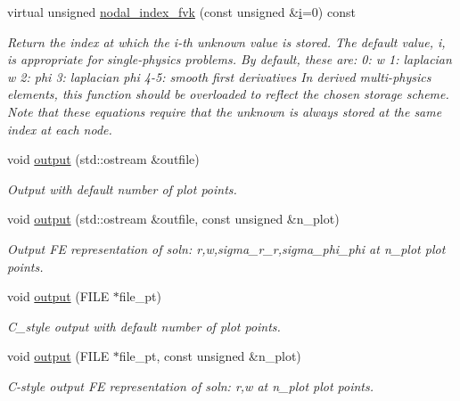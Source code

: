 \begin{DoxyCompactItemize}
virtual unsigned \hyperlink{classoomph_1_1AxisymFoepplvonKarmanEquations_a481e2bbbd87723e7b91a79bcb83e361c}{nodal\+\_\+index\+\_\+fvk} (const unsigned \&\hyperlink{cfortran_8h_adb50e893b86b3e55e751a42eab3cba82}{i}=0) const
\begin{DoxyCompactList}\small\item\em Return the index at which the i-\/th unknown value is stored. The default value, i, is appropriate for single-\/physics problems. By default, these are\+: 0\+: w 1\+: laplacian w 2\+: phi 3\+: laplacian phi 4-\/5\+: smooth first derivatives In derived multi-\/physics elements, this function should be overloaded to reflect the chosen storage scheme. Note that these equations require that the unknown is always stored at the same index at each node. \end{DoxyCompactList}\item 
void \hyperlink{classoomph_1_1AxisymFoepplvonKarmanEquations_a162b507ce3d9126a558790e77ec86e70}{output} (std\+::ostream \&outfile)
\begin{DoxyCompactList}\small\item\em Output with default number of plot points. \end{DoxyCompactList}\item 
void \hyperlink{classoomph_1_1AxisymFoepplvonKarmanEquations_a704051a00a2c8624edb98f3ba05e63a2}{output} (std\+::ostream \&outfile, const unsigned \&n\+\_\+plot)
\begin{DoxyCompactList}\small\item\em Output FE representation of soln\+: r,w,sigma\+\_\+r\+\_\+r,sigma\+\_\+phi\+\_\+phi at n\+\_\+plot plot points. \end{DoxyCompactList}\item 
void \hyperlink{classoomph_1_1AxisymFoepplvonKarmanEquations_a236f169caf08c0214ff686e939b9dd33}{output} (F\+I\+LE $\ast$file\+\_\+pt)
\begin{DoxyCompactList}\small\item\em C\+\_\+style output with default number of plot points. \end{DoxyCompactList}\item 
void \hyperlink{classoomph_1_1AxisymFoepplvonKarmanEquations_a5278f37c336b7a4bd2931fdedd2945f8}{output} (F\+I\+LE $\ast$file\+\_\+pt, const unsigned \&n\+\_\+plot)
\begin{DoxyCompactList}\small\item\em C-\/style output FE representation of soln\+: r,w at n\+\_\+plot plot points. \end{DoxyCompactList}\item 

\end{DoxyCompactItemize}
